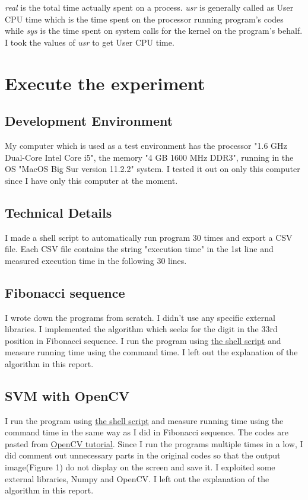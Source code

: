 \documentclass[11pt, a4paper]{article}
\begin{document}
{\it real} is the total time actually spent on a process. {\it usr} is generally called as User CPU time which is the time spent on the processor running program's codes while {\it sys} is the time spent on system calls for the kernel on the program's behalf. \\

I took the values of {\it usr} to get User CPU time.

\section{Execute the experiment}
\subsection{Development Environment}
My computer which is used as a test environment has the processor "1.6 GHz Dual-Core Intel Core i5", the memory "4 GB 1600 MHz DDR3", running in the OS "MacOS Big Sur version 11.2.2" system. I tested it out on only this computer since I have only this computer at the moment.
\subsection{Technical Details}
I made a shell script to automatically run program 30 times and export a CSV file. Each CSV file contains the string "execution time" in the 1st line and measured execution time in the following 30 lines. 

\subsection{Fibonacci sequence}
I wrote down the programs from scratch. I didn't use any specific external libraries. I implemented the algorithm which seeks for the digit in the 33rd position in Fibonacci sequence. I run the program using \href{https://github.com/Rintarooo/time_cpp_python/blob/master/fibo/run.sh}{\underline{the shell script}} and measure running time using the command time. I left out the explanation of the algorithm in this report.

\subsection{SVM with OpenCV}
I run the program using \href{https://github.com/Rintarooo/time_cpp_python/blob/master/svm/run.sh}{\underline{the shell script}} and measure running time using the command time in the same way as I did in Fibonacci sequence. The codes are pasted from \href{https://docs.opencv.org/master/d1/d73/tutorial_introduction_to_svm.html}{\underline{OpenCV tutorial}}. Since I run the programs multiple times in a low, I did comment out unnecessary parts in the original codes so that the output image(Figure 1) do not display on the screen and save it. I exploited some external libraries, Numpy and OpenCV. I left out the explanation of the algorithm in this report.
\end{document}
